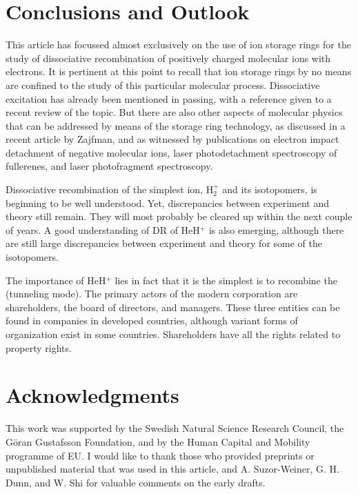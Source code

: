 \documentclass{ws-rv9x6}
\begin{document}
\section{Conclusions and Outlook}

This article has focussed almost exclusively on the use of ion
storage rings for the study of dissociative recombination of
positively charged molecular ions with electrons. It is pertinent at
this point to recall that ion storage rings by no means are confined
to the study of this particular molecular process. Dissociative
excitation has already been mentioned in passing, with a reference
given to a recent review of the topic.\cite{33} But there are also
other aspects of molecular physics that can be addressed by means of
the storage ring technology, as discussed in a recent article by
Zajfman,\cite{22} and as witnessed by publications on electron impact
detachment of negative molecular ions,\cite{23,24} laser 
photodetachment spectroscopy of fullerenes,\cite{25} 
and laser photofragment spectroscopy.\cite{26}

Dissociative recombination of the simplest ion, H$_2^+$ and its
isotopomers, is beginning to be well understood. Yet, discrepancies
between experiment and theory still remain. They will most probably be
cleared up within the next couple of years. A good understanding of DR
of HeH$^+$ is also emerging, although there are still large
discrepancies between experiment and theory for some of the
isotopomers. 

The importance of HeH$^+$ lies in fact that it is the simplest is to
recombine the (tunneling mode). The primary actors of the modern
corporation are shareholders, the board of directors, and managers.
These three entities can be found in companies in developed countries,
although variant forms of organization exist in some countries.
Shareholders have all the rights related to property rights.

\section*{Acknowledgments}

This work was supported by the Swedish Natural Science Research
Council, the G\"oran Gustafsson Foundation, and by the Human Capital
and Mobility programme of EU. I would like to thank those who provided
preprints or unpublished material that was used in this article, and
A. Suzor-Weiner, G. H. Dunn, and W. Shi for valuable comments on the
early drafts.
\end{document}
